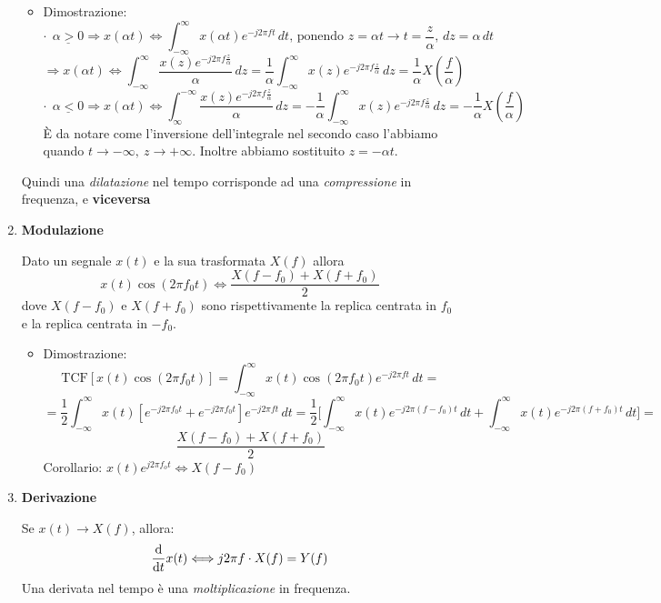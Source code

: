 \documentclass[
  paper=a4,
  ,captions=tableheading
]{scrartcl}
\providecommand{\tightlist}{%
  \setlength{\itemsep}{0pt}\setlength{\parskip}{0pt}}
\begin{document}
\begin{enumerate}
  \begin{itemize}
  \tightlist
  \item
    Dimostrazione: \[
    \cdot \ \ \underline{\alpha > 0} \Rightarrow x(\alpha t) \Longleftrightarrow \int_{-\infty}^{\infty} x(\alpha t) e^{-j2\pi ft} \,dt \text{, ponendo } z=\alpha t \to t = \frac{z}{\alpha}, \,dz = \alpha \,dt 
    \] \[
    \Rightarrow x(\alpha t) \Longleftrightarrow \int_{-\infty}^{\infty} \frac{x(z) e^{-j2\pi f \frac{z}{\alpha}}}{\alpha} \,dz = \frac{1}{\alpha}\int_{-\infty}^{\infty} x(z) e^{-j2\pi f \frac{z}{\alpha}} \,dz = \frac{1}{\alpha} X(\frac{f}{\alpha})
    \] \[
    \cdot \ \ \underline{\alpha < 0} \Rightarrow x(\alpha t) \Longleftrightarrow \int_{\infty}^{-\infty} \frac{x(z) e^{-j2\pi f \frac{z}{\alpha}}}{\alpha} \,dz = -\frac{1}{\alpha}\int_{-\infty}^{\infty} x(z) e^{-j2\pi f \frac{z}{\alpha}} \,dz = -\frac{1}{\alpha} X(\frac{f}{\alpha})
    \] È da notare come l'inversione dell'integrale nel secondo caso
    l'abbiamo quando \(t \to -\infty, \ z \to +\infty\). Inoltre abbiamo
    sostituito \(z=-\alpha t\).
  \end{itemize}

  Quindi una \emph{dilatazione} nel tempo corrisponde ad una
  \emph{compressione} in frequenza, e \textbf{viceversa}
\item
  \textbf{Modulazione}

  Dato un segnale \(x(t)\) e la sua trasformata \(X(f)\) allora \[
  x(t)\cos(2\pi f_{0}t) \Longleftrightarrow \frac{X(f-f_0)+X(f+f_0)}{2}
  \] dove \(X(f-f_0)\) e \(X(f+f_0)\) sono rispettivamente la replica
  centrata in \(f_0\) e la replica centrata in \(-f_0\).

  \begin{itemize}
  \tightlist
  \item
    Dimostrazione: \[
    \text{TCF}[x(t)\cos(2\pi f_{0}t)] = \int_{-\infty}^{\infty} x(t)\cos(2\pi f_{0}t)  e^{-j2\pi ft} \,dt = 
    \] \[
    = \frac{1}{2} \int_{-\infty}^{\infty} x(t) [e^{-j2\pi f_0 t}+ e^{-j2\pi f_0 t}]e^{-j2\pi ft} \,dt = \frac{1}{2}\Big[\int_{-\infty}^{\infty}x(t)  e^{-j2\pi (f-f_0)t}\,dt + \int_{-\infty}^{\infty}x(t)  e^{-j2\pi (f+f_0)t}\,dt  \Big] =
    \] \[
    \frac{X(f-f_0)+X(f+f_0)}{2}
    \] Corollario: \(x(t)e^{j2\pi f_{o}t} \Longleftrightarrow X(f-f_0)\)
  \end{itemize}
\item
  \textbf{Derivazione}

  Se \(x(t) \to X(f)\), allora: \[
  \dv{}{t} x(t) \Longleftrightarrow j2\pi f \cdot X(f) = Y(f)
  \] Una derivata nel tempo è una \emph{moltiplicazione} in frequenza.


\end{enumerate}
\end{document}
